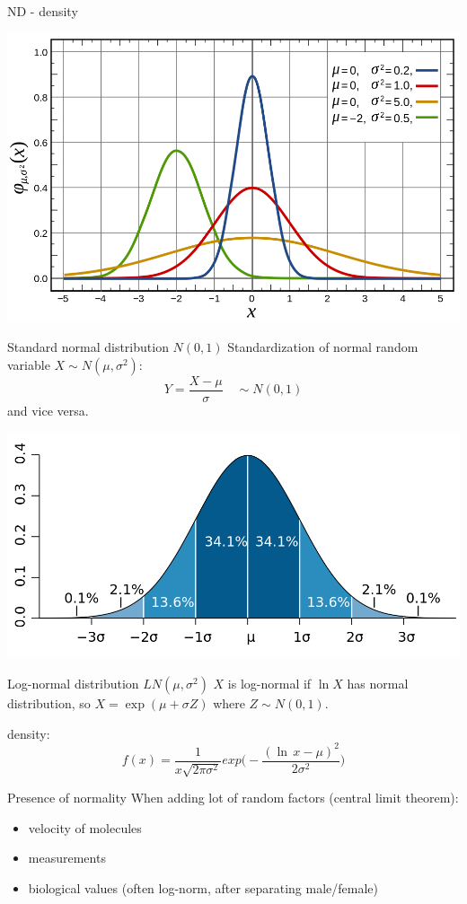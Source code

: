 \documentclass[smaller]{beamer}
\begin{document}
\begin{frame}{ND - density}
 \begin{center}
 \includegraphics[scale=0.3]{./04_normal_distribution.png}
\end{center}

\end{frame}

\begin{frame}{Standard normal distribution $N(0,1)$}
Standardization of normal random variable $X \sim N(\mu, \sigma^2)$:
\[
 Y = \frac{X - \mu}{\sigma} \quad \sim N(0,1)
\]
and vice versa.
 \begin{center}
 \includegraphics[scale=0.3]{./04_standard_deviation_diagram.png}
\end{center}

\end{frame}


\begin{frame}{Log-normal distribution $LN(\mu, \sigma^2)$}
$X$ is log-normal if $\ln X$ has normal distribution,
so $X=\exp( \mu + \sigma Z)$ where $Z \sim N(0,1)$.

density:
\[
 f(x) = \frac{1}{x\sqrt{2\pi \sigma^2}} exp\Big( - \frac{ (\ln\,x - \mu)^2}{2\sigma^2} \Big)
\]
\end{frame}

\begin{frame}{Presence of normality}
 When adding lot of random factors (central limit theorem):
 \begin{itemize}
  \item velocity of molecules
  \item measurements
  \item biological values (often log-norm, after separating male/female)
 \end{itemize}
\end{frame}
\end{document}
